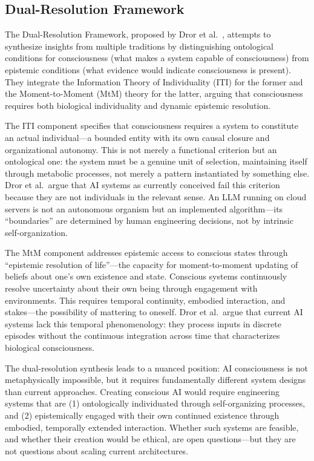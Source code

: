 \subsection{Dual-Resolution Framework}

The Dual-Resolution Framework, proposed by Dror et al.\ \cite{dror2025dual}, attempts to
synthesize insights from multiple traditions by distinguishing ontological conditions for
consciousness (what makes a system capable of consciousness) from epistemic conditions
(what evidence would indicate consciousness is present). They integrate the Information
Theory of Individuality (ITI) for the former and the Moment-to-Moment (MtM) theory for
the latter, arguing that consciousness requires both biological individuality and dynamic
epistemic resolution.

The ITI component specifies that consciousness requires a system to constitute an actual
individual---a bounded entity with its own causal closure and organizational autonomy.
This is not merely a functional criterion but an ontological one: the system must be a
genuine unit of selection, maintaining itself through metabolic processes, not merely a
pattern instantiated by something else. Dror et al.\ argue that AI systems as currently
conceived fail this criterion because they are not individuals in the relevant sense. An
LLM running on cloud servers is not an autonomous organism but an implemented
algorithm---its ``boundaries'' are determined by human engineering decisions, not by
intrinsic self-organization.

The MtM component addresses epistemic access to conscious states through ``epistemic
resolution of life''---the capacity for moment-to-moment updating of beliefs about one's
own existence and state. Conscious systems continuously resolve uncertainty about their
own being through engagement with environments. This requires temporal continuity, embodied
interaction, and stakes---the possibility of mattering to oneself. Dror et al.\ argue that
current AI systems lack this temporal phenomenology: they process inputs in discrete
episodes without the continuous integration across time that characterizes biological
consciousness.

The dual-resolution synthesis leads to a nuanced position: AI consciousness is not
metaphysically impossible, but it requires fundamentally different system designs than
current approaches. Creating conscious AI would require engineering systems that are
(1) ontologically individuated through self-organizing processes, and (2) epistemically
engaged with their own continued existence through embodied, temporally extended interaction.
Whether such systems are feasible, and whether their creation would be ethical, are open
questions---but they are not questions about scaling current architectures.
